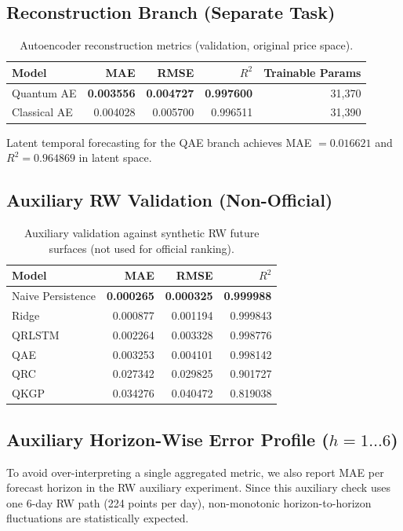 \documentclass[11pt]{article}
\begin{document}
\subsection{Reconstruction Branch (Separate Task)}
\begin{table}[H]
\centering
\caption{Autoencoder reconstruction metrics (validation, original price space).}
\begin{tabular}{lrrrr}
\toprule
Model & MAE & RMSE & \(R^2\) & Trainable Params \\
\midrule
Quantum AE & \textbf{0.003556} & \textbf{0.004727} & \textbf{0.997600} & 31,370 \\
Classical AE & 0.004028 & 0.005700 & 0.996511 & 31,390 \\
\bottomrule
\end{tabular}
\end{table}

Latent temporal forecasting for the QAE branch achieves MAE \(=0.016621\) and \(R^2=0.964869\) in latent space.

\subsection{Auxiliary RW Validation (Non-Official)}
\begin{table}[H]
\centering
\caption{Auxiliary validation against synthetic RW future surfaces (not used for official ranking).}
\begin{tabular}{lrrr}
\toprule
Model & MAE & RMSE & \(R^2\) \\
\midrule
Naive Persistence & \textbf{0.000265} & \textbf{0.000325} & \textbf{0.999988} \\
Ridge & 0.000877 & 0.001194 & 0.999843 \\
QRLSTM & 0.002264 & 0.003328 & 0.998776 \\
QAE & 0.003253 & 0.004101 & 0.998142 \\
QRC & 0.027342 & 0.029825 & 0.901727 \\
QKGP & 0.034276 & 0.040472 & 0.819038 \\
\bottomrule
\end{tabular}
\end{table}

\subsection{Auxiliary Horizon-Wise Error Profile (\(h=1\ldots6\))}
To avoid over-interpreting a single aggregated metric, we also report MAE per forecast horizon in the RW auxiliary experiment.
Since this auxiliary check uses one 6-day RW path (224 points per day), non-monotonic horizon-to-horizon fluctuations are statistically expected.
\end{document}
